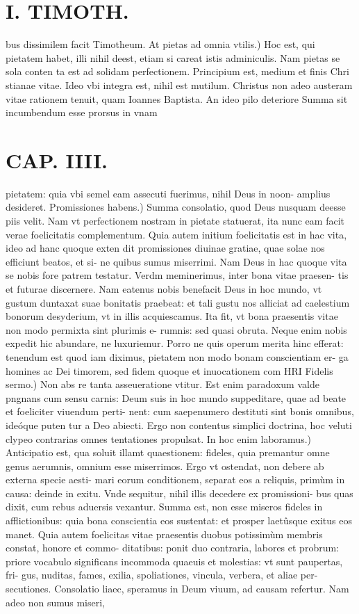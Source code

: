 \documentclass{article}
\begin{document}
\begin{pages}
\section*{I. TIMOTH. }
\marginpar{[ p.50]}\pstart bus dissimilem facit Timotheum.  \pend\pstart At pietas ad omnia vtilis.) Hoc est, qui pietatem habet, illi nihil deest, etiam si careat istis adminiculis. Nam pietas se sola conten ta est ad solidam perfectionem. Principium est, medium et finis Chri stianae vitae. Ideo vbi integra est, nihil est mutilum. Christus non adeo austeram vitae rationem tenuit, quam Ioannes Baptista. An ideo pilo deteriore Summa sit incumbendum esse prorsus in vnam  \pend
\section*{CAP. IIII. }
\marginpar{[ p.51]}\pstart pietatem: quia vbi semel eam assecuti fuerimus, nihil Deus in noon- amplius desideret.  \pend\pstart Promissiones habens.) Summa consolatio, quod Deus nusquam deesse piis velit. Nam vt perfectionem nostram in pietate statuerat, ita nunc eam facit verae foelicitatis complementum. Quia autem initium foelicitatis est in hac vita, ideo ad hanc quoque exten dit promissiones diuinae gratiae, quae solae nos efficiunt beatos, et si- ne quibus sumus miserrimi. Nam Deus in hac quoque vita se nobis fore patrem testatur. Verdm meminerimus, inter bona vitae praesen- tis et futurae discernere. Nam eatenus nobis benefacit Deus in hoc mundo, vt gustum duntaxat suae bonitatis praebeat: et tali gustu nos alliciat ad caelestium bonorum desyderium, vt in illis acquiescamus. Ita fit, vt bona praesentis vitae non modo permixta sint plurimis e- rumnis: sed quasi obruta. Neque enim nobis expedit hic abundare, ne luxuriemur. Porro ne quis operum merita hinc efferat: tenendum est quod iam diximus, pietatem non modo bonam conscientiam er- ga homines ac Dei timorem, sed fidem quoque et inuocationem com  \pend\pstart HRI Fidelis sermo.) Non abs re tanta asseueratione vtitur. Est enim paradoxum valde pngnans cum sensu carnis: Deum suis in hoc mundo suppeditare, quae ad beate et foeliciter viuendum perti- nent: cum saepenumero destituti sint bonis omnibus, ideóque puten tur a Deo abiecti. Ergo non contentus simplici doctrina, hoc veluti clypeo contrarias omnes tentationes propulsat.  \pend\pstart In hoc enim laboramus.) Anticipatio est, qua soluit illamt quaestionem: fideles, quia premantur omne genus aerumnis, omnium esse miserrimos. Ergo vt ostendat, non debere ab externa specie aesti- mari eorum conditionem, separat eos a reliquis, primùm in causa: deinde in exitu. Vnde sequitur, nihil illis decedere ex promissioni- bus quas dixit, cum rebus aduersis vexantur. Summa est, non esse miseros fideles in afflictionibus: quia bona conscientia eos sustentat: et prosper laetûsque exitus eos manet. Quia autem foelicitas vitae praesentis duobus potissimùm membris constat, honore et commo- ditatibus: ponit duo contraria, labores et probrum: priore vocabulo significans incommoda quaeuis et molestias: vt sunt paupertas, fri- gus, nuditas, fames, exilia, spoliationes, vincula, verbera, et aliae per- secutiones. Consolatio liaec, speramus in Deum viuum, ad causam refertur. Nam adeo non sumus miseri, 
\end{pages}
\end{document}
